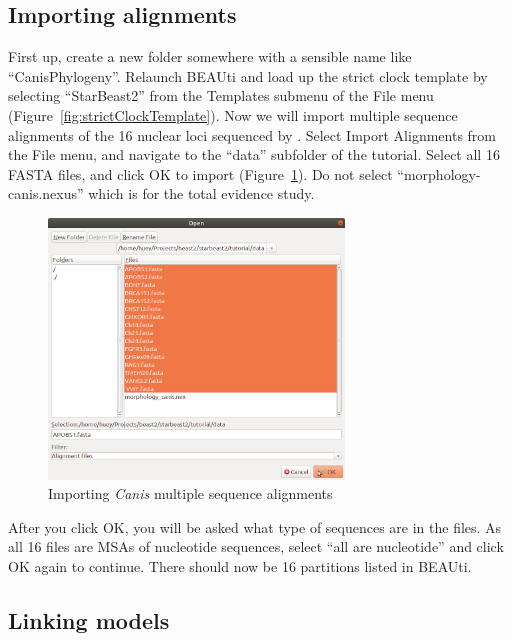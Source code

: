 \documentclass[12pt]{article}
\begin{document}
\subsection{Importing alignments}
\label{subsec:importingAlignments}

First up, create a new folder somewhere with a sensible name like
``CanisPhylogeny''. Relaunch BEAUti and load up the strict clock
template by selecting ``StarBeast2'' from the Templates submenu of the File menu
(Figure~\ref{fig:strictClockTemplate}). Now we will import multiple sequence
alignments of the 16 nuclear loci sequenced by \cite{LindbladToh2005}. Select
Import Alignments from the File menu, and navigate to the ``data'' subfolder
of the tutorial. Select all 16 FASTA files, and click OK to import
(Figure~\ref{fig:fastaFileImport}). Do not select ``morphology-canis.nexus''
which is for the total evidence study.

\begin{figure}[htb!]
\centering
\includegraphics[width=0.7\textwidth]{figures/fastaFileImport.png}
\caption
{Importing \textit{Canis} multiple sequence alignments}
\label{fig:fastaFileImport}
\end{figure}

After you click OK, you will be asked what type of sequences are in the files.
As all 16 files are MSAs of nucleotide sequences, select ``all are nucleotide''
and click OK again to continue. There should now be 16 partitions listed in
BEAUti.

\clearpage

\subsection{Linking models}
\label{subsec:linkingModels}
\end{document}
